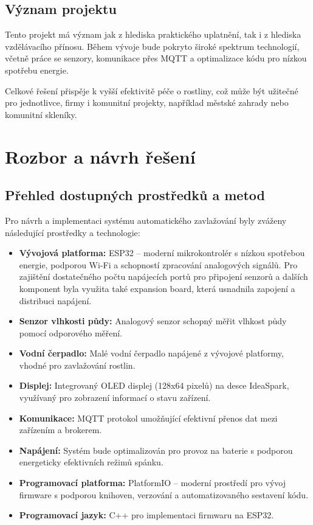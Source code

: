 \documentclass[a4paper, 11pt]{article}
\begin{document}
\subsection{Význam projektu}
Tento projekt má význam jak z hlediska praktického uplatnění, tak i z hlediska vzdělávacího přínosu. Během vývoje bude pokryto široké spektrum technologií, 
včetně práce se senzory, komunikace přes MQTT a optimalizace kódu pro nízkou spotřebu energie.

Celkové řešení přispěje k vyšší efektivitě péče o rostliny, což může být užitečné pro jednotlivce, firmy i komunitní projekty, například městské zahrady nebo komunitní skleníky.

\section{Rozbor a návrh řešení}

\subsection{Přehled dostupných prostředků a metod}

Pro návrh a implementaci systému automatického zavlažování byly zváženy následující prostředky a technologie:
\begin{itemize}
    \item \textbf{Vývojová platforma:} ESP32 – moderní mikrokontrolér s nízkou spotřebou energie, podporou Wi-Fi a schopností zpracování analogových signálů. Pro zajištění dostatečného počtu napájecích portů pro připojení senzorů a dalších komponent byla využita také expansion board, která usnadnila zapojení a distribuci napájení.
    \item \textbf{Senzor vlhkosti půdy:} Analogový senzor schopný měřit vlhkost půdy pomocí odporového měření.
    \item \textbf{Vodní čerpadlo:} Malé vodní čerpadlo napájené z vývojové platformy, vhodné pro zavlažování rostlin.
    \item \textbf{Displej:} Integrovaný OLED displej (128x64 pixelů) na desce IdeaSpark, využívaný pro zobrazení informací o stavu zařízení.
    \item \textbf{Komunikace:} MQTT protokol umožňující efektivní přenos dat mezi zařízením a brokerem.
    \item \textbf{Napájení:} Systém bude optimalizován pro provoz na baterie s podporou energeticky efektivních režimů spánku.
    \item \textbf{Programovací platforma:} PlatformIO – moderní prostředí pro vývoj firmware s podporou knihoven, verzování a automatizovaného sestavení kódu.
    \item \textbf{Programovací jazyk:} C++ pro implementaci firmwaru na ESP32.
\end{itemize}
\end{document}
